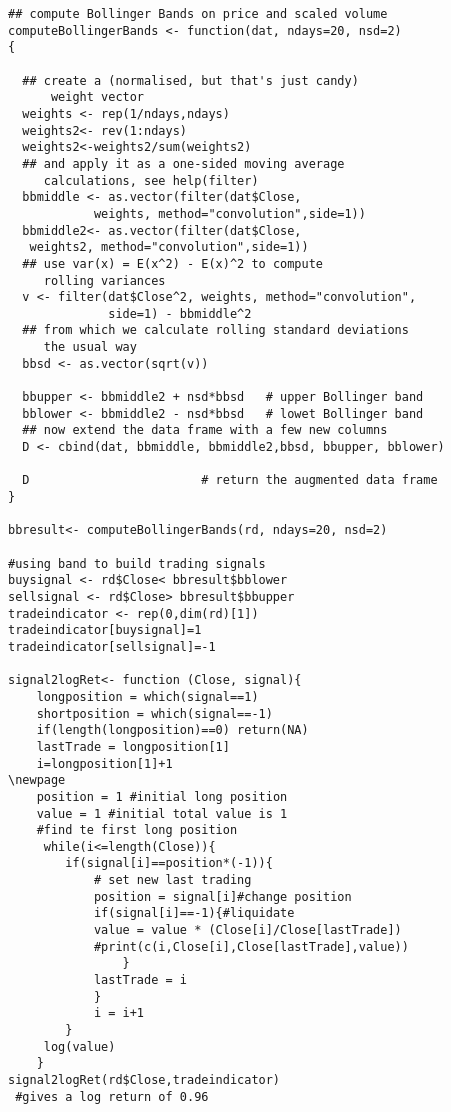 \begin{small}
\begin{lstlisting}
## compute Bollinger Bands on price and scaled volume
computeBollingerBands <- function(dat, ndays=20, nsd=2)
{

  ## create a (normalised, but that's just candy)
      weight vector
  weights <- rep(1/ndays,ndays)
  weights2<- rev(1:ndays)
  weights2<-weights2/sum(weights2)
  ## and apply it as a one-sided moving average
     calculations, see help(filter)
  bbmiddle <- as.vector(filter(dat$Close,
            weights, method="convolution",side=1))
  bbmiddle2<- as.vector(filter(dat$Close,
   weights2, method="convolution",side=1))
  ## use var(x) = E(x^2) - E(x)^2 to compute
     rolling variances
  v <- filter(dat$Close^2, weights, method="convolution",
              side=1) - bbmiddle^2
  ## from which we calculate rolling standard deviations
     the usual way
  bbsd <- as.vector(sqrt(v))

  bbupper <- bbmiddle2 + nsd*bbsd   # upper Bollinger band
  bblower <- bbmiddle2 - nsd*bbsd   # lowet Bollinger band
  ## now extend the data frame with a few new columns
  D <- cbind(dat, bbmiddle, bbmiddle2,bbsd, bbupper, bblower)

  D                        # return the augmented data frame
}

bbresult<- computeBollingerBands(rd, ndays=20, nsd=2)

#using band to build trading signals
buysignal <- rd$Close< bbresult$bblower
sellsignal <- rd$Close> bbresult$bbupper
tradeindicator <- rep(0,dim(rd)[1])
tradeindicator[buysignal]=1
tradeindicator[sellsignal]=-1

signal2logRet<- function (Close, signal){
	longposition = which(signal==1)
	shortposition = which(signal==-1)
	if(length(longposition)==0) return(NA)
	lastTrade = longposition[1]
	i=longposition[1]+1
\newpage
	position = 1 #initial long position
	value = 1 #initial total value is 1
	#find te first long position
     while(i<=length(Close)){
     	if(signal[i]==position*(-1)){
     		# set new last trading
     		position = signal[i]#change position
     		if(signal[i]==-1){#liquidate
     		value = value * (Close[i]/Close[lastTrade])
     		#print(c(i,Close[i],Close[lastTrade],value))
     			}  	
     		lastTrade = i 	
     		}
     		i = i+1
     	}
     log(value)
	}
signal2logRet(rd$Close,tradeindicator)	
 #gives a log return of 0.96
\end{lstlisting} 
\end{small}